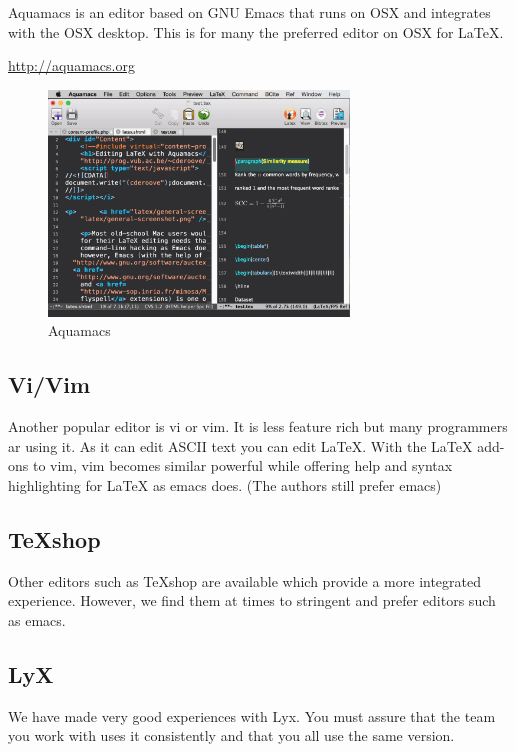 Aquamacs is an editor based on GNU Emacs that runs on OSX and
integrates with the OSX desktop. This is for many the preferred editor
on OSX for \LaTeX.

\url{http://aquamacs.org}

\begin{figure}[!htb]
  \centering\includegraphics[width=8cm]{images/aquamacs.png}
  \caption{Aquamacs}\label{F:aquamacs}
\end{figure}


\subsection{Vi/Vim}\label{vivim}

Another popular editor is vi or vim. It is less feature rich but many
programmers ar using it. As it can edit ASCII text you can edit LaTeX.
With the LaTeX add-ons to vim, vim becomes similar powerful while
offering help and syntax highlighting for LaTeX as emacs does. (The
authors still prefer emacs)

\subsection{TeXshop}\label{texshop}

Other editors such as TeXshop are available which provide a more
integrated experience. However, we find them at times to stringent and
prefer editors such as emacs.

\subsection{LyX}\label{lyx}

We have made very good experiences with Lyx. You must assure that the
team you work with uses it consistently and that you all use the same
version.

